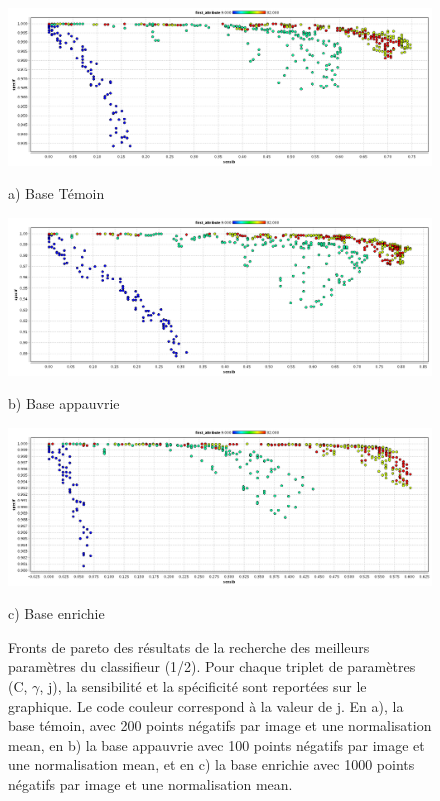 \begin{figure}[h!]
\label{fig:paretoParams1}
\begin{center}
 \includegraphics[width=14cm]{images/pareto_param_200.png}

{\small a) Base Témoin}
\vspace{0.5cm}

\includegraphics[width=14cm]{images/pareto_param_100.png}

{\small b) Base appauvrie}


 \includegraphics[width=14cm]{images/pareto_param_1000.png}
 
{\small c) Base enrichie}



\end{center}
 \caption{Fronts de pareto des résultats de la recherche des meilleurs paramètres du classifieur (1/2). Pour chaque triplet de paramètres (C, $\gamma$, j), la sensibilité et la spécificité sont reportées sur le graphique. Le code couleur correspond à la valeur de j. En a), la base témoin, avec 200 points négatifs par image et une normalisation mean, en b) la base appauvrie avec 100 points négatifs par image et une normalisation mean, et en c) la base enrichie avec 1000 points négatifs par image et une normalisation mean.}
\end{figure}




